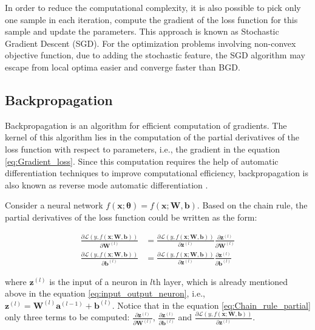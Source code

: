 \documentclass[
	parskip, 			   %
	twoside, 			   %
	DIV=14, 			   %
	BCOR=15.0mm, 		   %
	headsepline, 		   %
	open=right, 		   %
	captions=tableheading, %
	bibliography=totoc,    %
	numbers=noenddot       %
]{scrreprt}
\begin{document}
In order to reduce the computational complexity, it is also possible to pick only one sample in each iteration, compute the gradient of the loss function for this sample and update the parameters. This approach is known as Stochastic Gradient Descent (SGD). For the optimization problems involving non-convex objective function, due to adding the stochastic feature, the SGD algorithm may escape from local optima easier and converge faster than BGD.

\subsection{Backpropagation}
Backpropagation is an algorithm for efficient computation of gradients. The kernel of this algorithm lies in the computation of the partial derivatives of the loss function with respect to parameters, i.e., the gradient in the equation \ref{eq:Gradient_loss}. Since this computation requires the help of automatic differentiation techniques to improve computational efficiency, backpropagation is also known as reverse mode automatic differentiation \cite{baydin2018automatic}.

Consider a neural network $f(\mathbf{x};\mathbf{\theta})=f(\mathbf{x};\mathbf{W},\mathbf{b})$. Based on the chain rule, the partial derivatives of the loss function could be written as the form:

\begin{equation}
    \label{eq:Chain_rule_partial}
    \begin{aligned}
        \frac{\partial \mathcal{L}\left( y,f(\mathbf{x};\mathbf{\mathbf{W},\mathbf{b}}) \right)}{\partial \mathbf{W}^{(l)}} &= \frac{\partial \mathcal{L}\left( y,f(\mathbf{x};\mathbf{\mathbf{W},\mathbf{b}}) \right)}{\partial \mathbf{z}^{(l)}} 
        \frac{\partial \mathbf{z}^{(l)}}{\partial \mathbf{W}^{(l)}}
        \\
        \frac{\partial \mathcal{L}\left( y,f(\mathbf{x};\mathbf{\mathbf{W},\mathbf{b}}) \right)}{\partial \mathbf{b}^{(l)}} &= \frac{\partial \mathcal{L}\left( y,f(\mathbf{x};\mathbf{\mathbf{W},\mathbf{b}}) \right)}{\partial \mathbf{z}^{(l)}}
        \frac{\partial \mathbf{z}^{(l)}}{\partial \mathbf{b}^{(l)}}
    \end{aligned}
\end{equation}

where $\mathbf{z}^{(l)}$ is the input of a neuron in $l$th layer, which is already mentioned above in the equation \ref{eq:input_output_neuron}, i.e., $\mathbf{z}^{(l)} = \mathbf{W}^{(l)} \mathbf{a}^{(l-1)} + \mathbf{b}^{(l)}$. Notice that in the equation \ref{eq:Chain_rule_partial} only three terms to be computed: $\frac{\partial \mathbf{z}^{(l)}}{\partial \mathbf{W}^{(l)}}$, $\frac{\partial \mathbf{z}^{(l)}}{\partial \mathbf{b}^{(l)}}$ and $\frac{\partial \mathcal{L}\left( y,f(\mathbf{x};\mathbf{\mathbf{W},\mathbf{b}}) \right)}{\partial \mathbf{z}^{(l)}}$.
\end{document}

